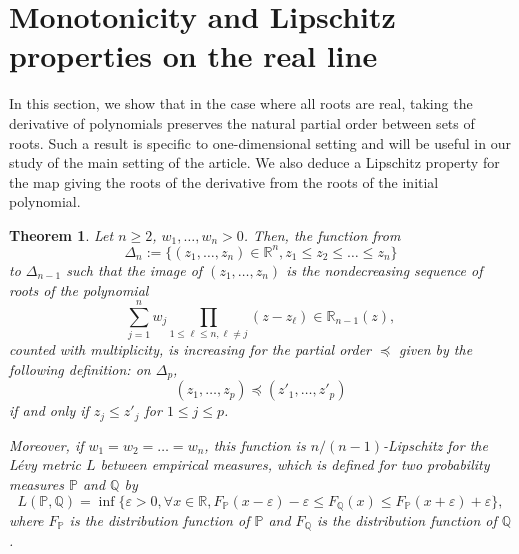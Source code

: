 \documentclass[11pt]{amsart}
\newtheorem{theorem}{Theorem}[section]
\begin{document}
 





\section{Monotonicity and Lipschitz properties on the real line} \label{2}
In this section, we show that in the case where all roots are real, 
taking the derivative of polynomials preserves the natural partial order between sets of roots. 
Such a result is specific to one-dimensional setting and will be useful in our study of the main setting of the article. We also deduce a Lipschitz property for the map giving the roots of the derivative from the roots of the initial polynomial. 

\begin{theorem} \label{monotonicity}
Let $n \geq 2$, $w_1, \dots, w_n > 0$. Then, the function from $$ \Delta_n := \{ (z_1, \dots, z_n)\in  \mathbb{R}^n, z_1 \leq z_2 \leq \dots \leq z_n \} $$ to $\Delta_{n-1}$
such that the image of $(z_1, \dots, z_n)$ 
is the nondecreasing sequence of roots of the polynomial 
$$\sum_{j=1}^n w_j \prod_{1 \leq \ell \leq n, \ell \neq j} (z - z_\ell) \in \mathbb{R}_{n-1}(z),$$
counted with multiplicity, is increasing for the partial order $\preccurlyeq$ given by the following definition: on $\Delta_p$, 
$$(z_1, \dots, z_p) \preccurlyeq (z'_1, \dots, z'_p) $$
if and only if $z_j \leq z'_j$ for $1 \leq j \leq p$.

Moreover, if $w_1 = w_2 = \dots = w_n$, this function is $n/(n-1)$-Lipschitz for the L\'evy metric $L$ between empirical measures, which is defined for two probability measures $\mathbb{P}$ and 
$\mathbb{Q}$ by 
$$L(\mathbb{P}, \mathbb{Q}) = 
\inf \{\varepsilon > 0, \forall x \in \mathbb{R},
F_{\mathbb{P}} (x - \varepsilon ) - \varepsilon \leq F_{\mathbb{Q}}(x) \leq F_{\mathbb{P}} (x + \varepsilon ) + \varepsilon  \},$$
where $F_{\mathbb{P}}$ is the distribution function of $\mathbb{P}$ and $F_{\mathbb{Q}}$ is the distribution function of $\mathbb{Q}$. 



\end{theorem}
\end{document}
